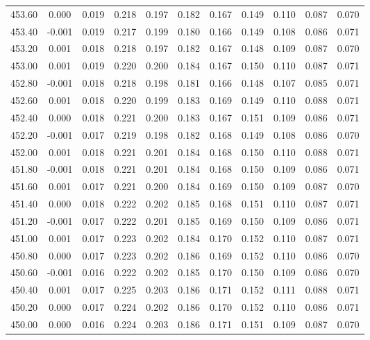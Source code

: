 \begin{longtable}{cccccccccc}
    453.60 &  0.000 &  0.019 &  0.218 &  0.197 &  0.182 &  0.167 &  0.149 &  0.110 &  0.087 &  0.070 \\
    453.40 & -0.001 &  0.019 &  0.217 &  0.199 &  0.180 &  0.166 &  0.149 &  0.108 &  0.086 &  0.071 \\
    453.20 &  0.001 &  0.018 &  0.218 &  0.197 &  0.182 &  0.167 &  0.148 &  0.109 &  0.087 &  0.070 \\
    453.00 &  0.001 &  0.019 &  0.220 &  0.200 &  0.184 &  0.167 &  0.150 &  0.110 &  0.087 &  0.071 \\
    452.80 & -0.001 &  0.018 &  0.218 &  0.198 &  0.181 &  0.166 &  0.148 &  0.107 &  0.085 &  0.071 \\
    452.60 &  0.001 &  0.018 &  0.220 &  0.199 &  0.183 &  0.169 &  0.149 &  0.110 &  0.088 &  0.071 \\
    452.40 &  0.000 &  0.018 &  0.221 &  0.200 &  0.183 &  0.167 &  0.151 &  0.109 &  0.086 &  0.071 \\
    452.20 & -0.001 &  0.017 &  0.219 &  0.198 &  0.182 &  0.168 &  0.149 &  0.108 &  0.086 &  0.070 \\
    452.00 &  0.001 &  0.018 &  0.221 &  0.201 &  0.184 &  0.168 &  0.150 &  0.110 &  0.088 &  0.071 \\
    451.80 & -0.001 &  0.018 &  0.221 &  0.201 &  0.184 &  0.168 &  0.150 &  0.109 &  0.086 &  0.071 \\
    451.60 &  0.001 &  0.017 &  0.221 &  0.200 &  0.184 &  0.169 &  0.150 &  0.109 &  0.087 &  0.070 \\
    451.40 &  0.000 &  0.018 &  0.222 &  0.202 &  0.185 &  0.168 &  0.151 &  0.110 &  0.087 &  0.071 \\
    451.20 & -0.001 &  0.017 &  0.222 &  0.201 &  0.185 &  0.169 &  0.150 &  0.109 &  0.086 &  0.071 \\
    451.00 &  0.001 &  0.017 &  0.223 &  0.202 &  0.184 &  0.170 &  0.152 &  0.110 &  0.087 &  0.071 \\
    450.80 &  0.000 &  0.017 &  0.223 &  0.202 &  0.186 &  0.169 &  0.152 &  0.110 &  0.086 &  0.070 \\
    450.60 & -0.001 &  0.016 &  0.222 &  0.202 &  0.185 &  0.170 &  0.150 &  0.109 &  0.086 &  0.070 \\
    450.40 &  0.001 &  0.017 &  0.225 &  0.203 &  0.186 &  0.171 &  0.152 &  0.111 &  0.088 &  0.071 \\
    450.20 &  0.000 &  0.017 &  0.224 &  0.202 &  0.186 &  0.170 &  0.152 &  0.110 &  0.086 &  0.071 \\
    450.00 &  0.000 &  0.016 &  0.224 &  0.203 &  0.186 &  0.171 &  0.151 &  0.109 &  0.087 &  0.070 \\

\end{longtable}
